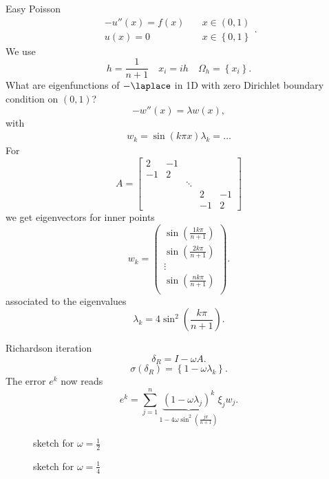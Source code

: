 \begin{exam} Easy Poisson
\[
	\begin{array}{rl}
		-u''(x) = f(x) &\quad x \in (0,1) \\
		u(x) = 0 &\quad x \in \left\{ 0,1 \right\} 
	\end{array}
.\] 	
We use
\[
h = \frac{1}{n+1} \quad x_{i}= ih \quad \Omega _{h} = \left\{ x_{i} \right\} 
.\] 
What are eigenfunctions of $-\laplace$ in 1D with zero Dirichlet boundary condition on $(0,1)$?
\[
	-w''(x) = \lambda w(x)
,\] 
with
\begin{align*}
	w_{k} = \sin(k \pi x)
	\lambda _{k} = \ldots 
\end{align*}
For
\[
A = \begin{bmatrix}
	2 & -1 \\
	-1 & 2 \\
	   && \ddots \\
	   &&&2 & -1 \\
	   &&&-1 & 2
	\end{bmatrix}
\] 
we get eigenvectors for inner points
\[
w_{k} = \begin{pmatrix}
	\sin \left( \frac{1k \pi }{n+1} \right) \\
	\sin \left( \frac{2k \pi }{n+1} \right) \\
	\vdots \\
	\sin \left( \frac{nk \pi }{n+1} \right) \\
\end{pmatrix}
.\] 
associated to the eigenvalues
\[
	\lambda _{k} =  4\sin^2 \left( \frac{k \pi }{n+1} \right) 
.\] 
\end{exam}

Richardson iteration
\[
\delta _{R} = I-\omega A
.\] 
\[
	\sigma (\delta _{R}) = \left\{ 1-\omega \lambda _{k} \right\} 
.\] 
The error $e^{k}$ now reads
\[
	e^{k} = \sum_{j=1}^{n}{\underbrace{(1-\omega \lambda _{j})^{k}}_{1-4 \omega \sin^2 \left( \frac{j \pi }{n+1} \right) } \xi _{j} w_{j}}
.\] 

\begin{figure}[H]
	\begin{center}
		
	\end{center}
	\caption{sketch for $\omega = \frac{1}{2}$}
	\label{fig:}
\end{figure}

\begin{figure}[H]
	\begin{center}
		
	\end{center}
	\caption{sketch for $\omega = \frac{1}{4}$}
	\label{fig:}
\end{figure}
